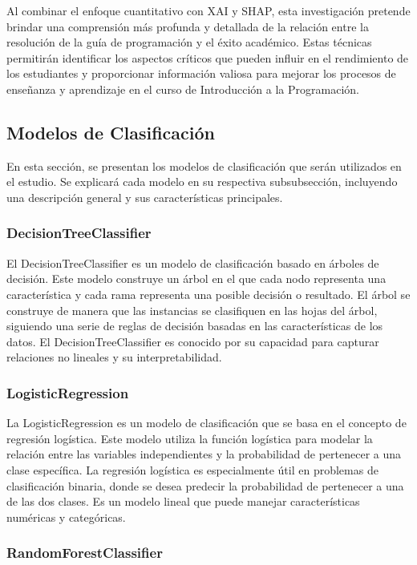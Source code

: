 Al combinar el enfoque cuantitativo con XAI y SHAP, esta investigación pretende brindar una comprensión más profunda y detallada de la relación entre la resolución de la guía de programación y el éxito académico. Estas técnicas permitirán identificar los aspectos críticos que pueden influir en el rendimiento de los estudiantes y proporcionar información valiosa para mejorar los procesos de enseñanza y aprendizaje en el curso de Introducción a la Programación.

\subsection{Modelos de Clasificación}

En esta sección, se presentan los modelos de clasificación que serán utilizados en el estudio. Se explicará cada modelo en su respectiva subsubsección, incluyendo una descripción general y sus características principales.

\subsubsection{DecisionTreeClassifier}

El DecisionTreeClassifier es un modelo de clasificación basado en árboles de decisión. Este modelo construye un árbol en el que cada nodo representa una característica y cada rama representa una posible decisión o resultado. El árbol se construye de manera que las instancias se clasifiquen en las hojas del árbol, siguiendo una serie de reglas de decisión basadas en las características de los datos. El DecisionTreeClassifier es conocido por su capacidad para capturar relaciones no lineales y su interpretabilidad.

\subsubsection{LogisticRegression}

La LogisticRegression es un modelo de clasificación que se basa en el concepto de regresión logística. Este modelo utiliza la función logística para modelar la relación entre las variables independientes y la probabilidad de pertenecer a una clase específica. La regresión logística es especialmente útil en problemas de clasificación binaria, donde se desea predecir la probabilidad de pertenecer a una de las dos clases. Es un modelo lineal que puede manejar características numéricas y categóricas.

\subsubsection{RandomForestClassifier}

